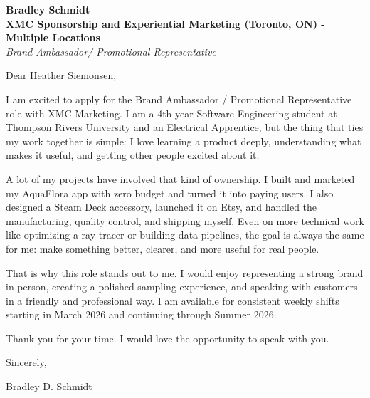 \documentclass[11pt]{article}
\begin{document}
\textbf{Bradley Schmidt}\\
\vspace{0.5em}
\textbf{XMC Sponsorship and Experiential Marketing (Toronto, ON) - Multiple Locations}\\
\textit{Brand Ambassador/ Promotional Representative}

Dear Heather Siemonsen,

\par

I am excited to apply for the Brand Ambassador / Promotional Representative role with XMC Marketing. I am a 4th-year Software Engineering student at Thompson Rivers University and an Electrical Apprentice, but the thing that ties my work together is simple: I love learning a product deeply, understanding what makes it useful, and getting other people excited about it.

\par

A lot of my projects have involved that kind of ownership. I built and marketed my AquaFlora app with zero budget and turned it into paying users. I also designed a Steam Deck accessory, launched it on Etsy, and handled the manufacturing, quality control, and shipping myself. Even on more technical work like optimizing a ray tracer or building data pipelines, the goal is always the same for me: make something better, clearer, and more useful for real people.

\par

That is why this role stands out to me. I would enjoy representing a strong brand in person, creating a polished sampling experience, and speaking with customers in a friendly and professional way. I am available for consistent weekly shifts starting in March 2026 and continuing through Summer 2026.

\par

Thank you for your time. I would love the opportunity to speak with you.

\par

Sincerely,

\par

Bradley D. Schmidt
\end{document}
